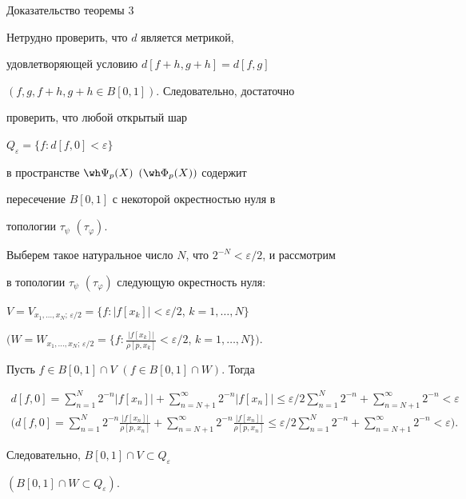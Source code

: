 \begin{pf*}{Доказательство теоремы 3}


Нетрудно проверить, что $d$ является метрикой, 


удовлетворяющей условию $d[f+h,g+h] = d[f,g]$


$(f, g, f + h, g + h \in B[0,1])$. Следовательно, достаточно


проверить, что любой открытый шар


$Q_{\varepsilon} = \{ f : d[f,0] < \varepsilon \}$


в пространстве $\wh \Psi_{p}(X)$ $(\wh \Phi_{p}(X))$ содержит 


пересечение $B[0,1]$ с некоторой окрестностью нуля в


топологии $\tau _{\psi }$ $(\tau_{\varphi})$. 


Выберем такое натуральное число $N$, что $2^{-N}<\varepsilon/2$, и рассмотрим


в топологии $\tau_{\psi}$ $(\tau_{\varphi})$ следующую окрестность нуля: 


$V = V_{x_{1},\dotsc,x_{N};\, \varepsilon/2} =


\{f : |f[x_{k}]| < \varepsilon/2$, $k = 1,\dotsc,N \}$


$(W = W_{x_{1},\dotsc,x_{N};\, \varepsilon/2} =


\{f : \frac{|f[x_{k}]|}{\rho[p,x_{k}]}


< \varepsilon/2$, $k = 1,\dotsc,N \})$.


Пусть $f \in B[0,1]\cap V$ $(f \in B[0,1]\cap W)$. Тогда 


\begin{gather*}


d[f,0] = \sum \limits_{n=1}^{N} 2^{- n}|f[x_{n}]| +


\sum \limits_{n=N+1}^{\infty } 2^{- n}|f[x_{n}]| \leq


\varepsilon/2 \sum \limits_{n=1}^{N} 2^{- n} +


\sum \limits_{n=N+1}^{\infty } 2^{- n} < \varepsilon \\


%


\bigg(d[f,0] = \sum \limits_{n=1}^{N} 2^{- n}


\frac{|f[x_{n}]|}{\rho[p,x_{n}]} +


\sum \limits_{n=N+1}^{\infty } 2^{- n}


\frac{|f[x_{n}]|}{\rho[p,x_{n}]} \leq \varepsilon/2


\sum \limits_{n=1}^{N} 2^{- n} +


\sum \limits_{n=N+1}^{\infty } 2^{- n} < \varepsilon\bigg).


\end{gather*}


Следовательно, $B[0,1]\cap V \subset Q_{\varepsilon}$


$(B[0,1]\cap W \subset Q_{\varepsilon})$.


\end{pf*}





